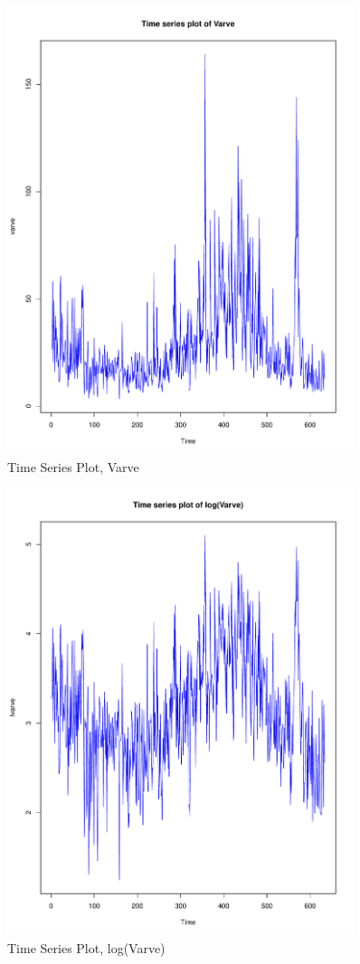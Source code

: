 \documentclass{article}
\begin{document}
\begin{figure}
	\centering
	\includegraphics[width=0.9\textwidth]{Tsplot-varve}
	\caption{Time Series Plot, Varve }
	\label{fig:tsplot-varve}
\end{figure}

\begin{figure}
	\centering
	\includegraphics[width=0.9\textwidth]{TsPlot-lvarve}
	\caption{Time Series Plot, log(Varve) }
	\label{fig:tsplot-lvarve}
\end{figure}
\end{document}
